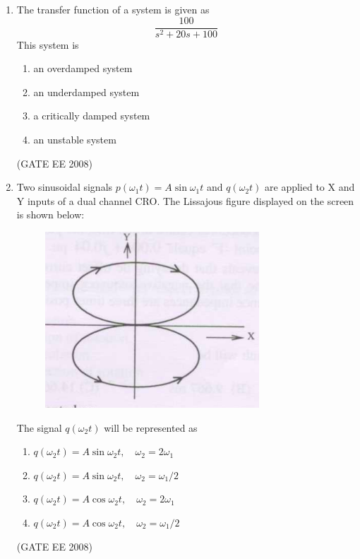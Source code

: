 \documentclass[journal,12pt,onecolumn]{IEEEtran}
\theoremstyle{remark}
\begin{document}
\begin{enumerate}[start=1, label=Q.\arabic*]
\item The transfer function of a system is given as
$$
\frac{100}{s^2+20s+100}
$$
This system is

\begin{multicols}{2}
\begin{enumerate}
    \item an overdamped system
    \item an underdamped system
    \item a critically damped system
    \item an unstable system
\end{enumerate}
\end{multicols}
\hfill (GATE EE 2008)




\item Two sinusoidal signals $p(\omega_1 t) = A \sin \omega_1 t$ and $q(\omega_2 t)$ are applied to X and Y inputs of a dual channel CRO. The Lissajous figure displayed on the screen is shown below:

\begin{figure}[H]
    \centering
    \includegraphics[width=\columnwidth]{Fig/q69.png}
    \caption{}
\end{figure}

The signal $q(\omega_2 t)$ will be represented as

\begin{multicols}{2}
\begin{enumerate}
    \item $q(\omega_2 t) = A \sin \omega_2 t, \quad \omega_2 = 2\omega_1$
    \item $q(\omega_2 t) = A \sin \omega_2 t, \quad \omega_2 = \omega_1/2$
    \item $q(\omega_2 t) = A \cos \omega_2 t, \quad \omega_2 = 2\omega_1$
    \item $q(\omega_2 t) = A \cos \omega_2 t, \quad \omega_2 = \omega_1/2$
\end{enumerate}
\end{multicols}
\hfill (GATE EE 2008)




\end{enumerate}
\end{document}
